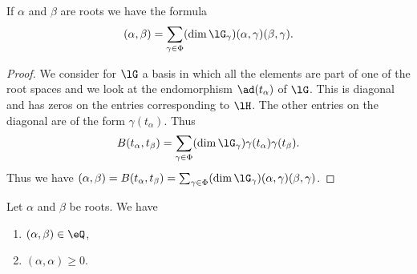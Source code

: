 \begin{lemma}       \label{Leminnerabequaaggb}
	If \( \alpha\) and \( \beta\) are roots we have the formula
	\begin{equation}
		(\alpha,\beta)=\sum_{\gamma\in\Phi}(\dim\lG_{\gamma})(\alpha,\gamma)(\beta,\gamma).
	\end{equation}
\end{lemma}

\begin{proof}
	We consider for \( \lG\) a basis in which all the elements are part of one of the root spaces and we look at the endomorphism \( \ad(t_{\alpha})\) of \( \lG\). This is diagonal and has zeros on the entries corresponding to \( \lH\). The other entries on the diagonal are of the form \( \gamma(t_{\alpha})\). Thus
	\begin{equation}
		B(t_{\alpha},t_{\beta})=\sum_{\gamma\in\Phi}(\dim\lG_{\gamma})\gamma(t_{\alpha})\gamma(t_{\beta}).
	\end{equation}
	Thus we have \( (\alpha,\beta)=B(t_{\alpha},t_{\beta})=\sum_{\gamma\in\Phi}(\dim\lG_{\gamma})(\alpha,\gamma)(\beta,\gamma)\).
\end{proof}

\begin{proposition}     \label{PropScalrooTsQ}
	Let \( \alpha\) and \( \beta\) be roots. We have
	\begin{enumerate}
		\item
		      \( (\alpha,\beta)\in\eQ\),
		\item
		      \( (\alpha,\alpha)\geq 0\).
	\end{enumerate}
\end{proposition}

